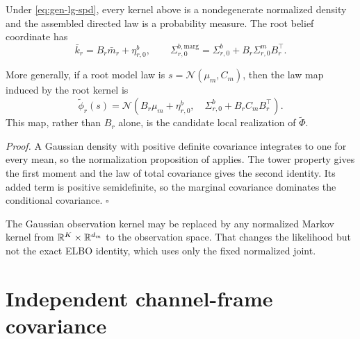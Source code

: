 Under \eqref{eq:gen-lg-spd}, every kernel above is a nondegenerate normalized density and the
assembled directed law is a probability measure.  The root belief coordinate has
\begin{equation}
\bar k_r=B_r\bar m_r+\eta_{r,0}^b,
\qquad
\Sigma_{r,0}^{b,\mathrm{marg}}
=\Sigma_{r,0}^b+B_r\Sigma_{r,0}^mB_r^\top.
\label{eq:gen-lg-root-marginal}
\end{equation}

More generally, if a root model law is
$s=\mathcal N(\mu_m,C_m)$, then the law map induced by the root kernel is
\begin{equation}
\widetilde\phi_r(s)
=\mathcal N\left(
B_r\mu_m+\eta_{r,0}^b,\quad
\Sigma_{r,0}^b+B_rC_mB_r^\top
\right).
\label{eq:gen-lg-induced-law-map}
\end{equation}
This map, rather than $B_r$ alone, is the candidate local realization of
$\widetilde\Phi$. 

\noindent\emph{Proof.}
A Gaussian density with positive definite covariance integrates to one for every mean, so the
normalization proposition of  applies.  The tower property gives the first
moment and the law of total covariance gives the second identity.  Its added term is positive
semidefinite, so the marginal covariance dominates the conditional covariance. \hfill$\square$

The Gaussian observation kernel may be replaced by any normalized Markov kernel from
$\mathbb R^K\times\mathbb R^{d_m}$ to the observation space.  That changes the likelihood but not the exact ELBO
identity, which uses only the fixed normalized joint. 

\section{Independent channel-frame covariance}
\label{sec:gen-gaussian-covariance}

